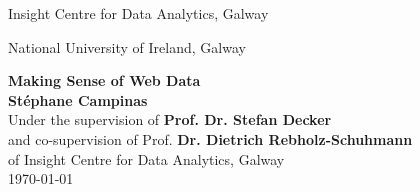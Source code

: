 \documentclass[12pt,chapterprefix=true]{scrbook}
\begin{document}
\begin{titlepage}
	\begin{center}
		\null
		\vspace{2cm}
		{\Large
		Insight Centre for Data Analytics, Galway\\
		\begin{figure}[h]
			\centering
		\end{figure}
		National University of Ireland, Galway\\
		\begin{figure}[h]
			\centering
		\end{figure}
		}
		\vspace{2cm}
		{\Huge \textbf{Making Sense of Web Data}}\\
		\vspace{1cm}
		{\Large \textbf{St\'ephane Campinas}}\\
		\vspace{1cm}
		Under the supervision of \textbf{Prof. Dr. Stefan Decker}\\
		and co-supervision of Prof. \textbf{Dr. Dietrich Rebholz-Schuhmann}\\
		of Insight Centre for Data Analytics, Galway\\
		\vspace{2cm}
		\today
	\end{center}
\end{titlepage}
\end{document}
